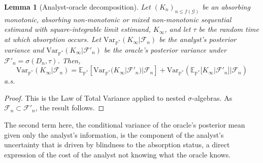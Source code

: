 \documentclass{article}
\newcommand{\Var}{\mathrm{Var}_{\mathbb{P}^*} }
\newtheorem{lemma}{Lemma}
\begin{document}
\begin{lemma}[Analyst-oracle decomposition]
\label{analytoracledecomp}
Let $(K_n)_{n\leq f(\mathcal{G})}$ be an absorbing monotonic, absorbing non-monotonic or mixed non-monotonic sequential estimand with square-integrable limit estimand, $K_\infty$, and let $\tau$ be the random time at which absorption occurs. Let $\Var(K_\infty|\mathcal{F}_n)$ be the analyst's posterior variance and $\Var(K_\infty|\mathcal{F}'_n)$ be the oracle's posterior variance under $\mathcal{F}'_n=\sigma(D_n,\tau)$. Then,
\[\Var(K_\infty|\mathcal{F}_n)= \mathbb{E}_{\mathbb{P}^*}[\Var(K_\infty|\mathcal{F}'_n)|\mathcal{F}_n]+\Var(\mathbb{E}_{\mathbb{P}^*}[K_\infty|\mathcal{F}'_n]|\mathcal{F}_n)\] 
a.s.
\end{lemma}
\begin{proof}
    This is the Law of Total Variance applied to nested $\sigma$-algebras. As $\mathcal{F}_n \subset \mathcal{F}'_n$, the result follows.
\end{proof}

The second term here, the conditional variance of the oracle's posterior mean given only the analyst's information, is the component of the analyst's uncertainty that is driven by blindness to the absorption status, a direct expression of the cost of the analyst not knowing what the oracle knows.
\end{document}
